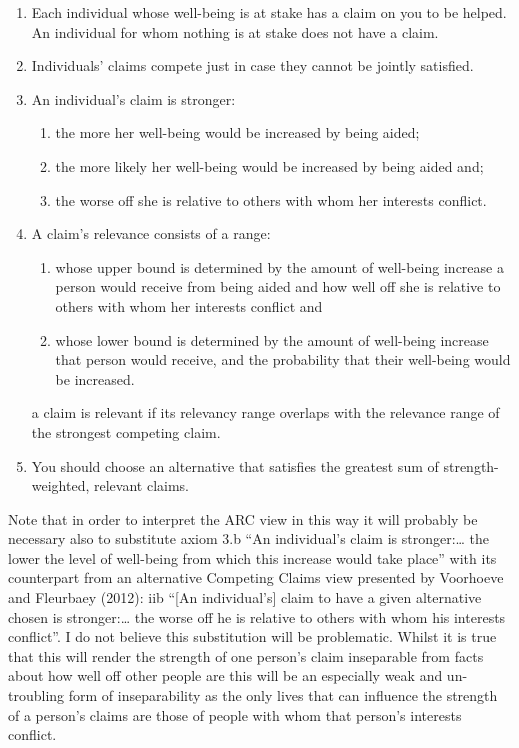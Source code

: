 \documentclass[man,11pt,a4paper]{apa7}
\begin{document}
\begin{enumerate}[label=\arabic*.]
\item Each individual whose well-being is at stake has a claim on you to be helped. An individual for whom nothing is at stake does not have a claim.
\item Individuals' claims compete just in case they cannot be jointly satisfied.
\item An individual's claim is stronger:
\begin{enumerate}[label=\alph*.]
\item the more her well-being would be increased by being aided;
\item the more likely her well-being would be increased by being aided and;
\item the worse off she is relative to others with whom her interests conflict.
\end{enumerate}
\item A claim's relevance consists of a range:
\begin{enumerate}[label=\alph*.]
\item whose upper bound is determined by the amount of well-being increase a person would receive from being aided and how well off she is relative to others with whom her interests conflict and
\item whose lower bound is determined by the amount of well-being increase that person would receive, and the probability that their well-being would be increased.
\end{enumerate}
\par a claim is relevant if its relevancy range overlaps with the relevance range of the strongest competing claim.
\item You should choose an alternative that satisfies the greatest sum of strength-weighted, relevant claims.
\end{enumerate}

Note that in order to interpret the ARC view in this way it will probably be necessary also to substitute axiom 3.b ``An individual's claim is stronger:\ldots{} the lower the level of well-being from which this increase would take place'' with its counterpart from an alternative Competing Claims view presented by Voorhoeve and Fleurbaey (2012): iib ``[An individual's] claim to have a given alternative chosen is stronger:\ldots{} the worse off he is relative to others with whom his interests conflict''. I do not believe this substitution will be problematic. Whilst it is true that this will render the strength of one person's claim inseparable from facts about how well off other people are this will be an especially weak and un-troubling form of inseparability as the only lives that can influence the strength of a person's claims are those of people with whom that person's interests conflict.
\end{document}
